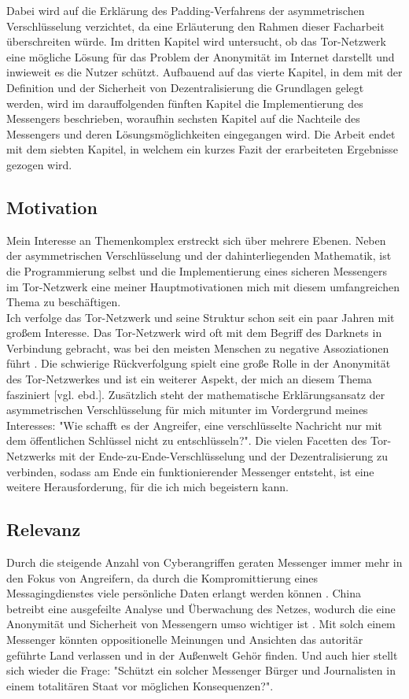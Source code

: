 \documentclass[a4paper,ngerman, headheight=28pt,12pt]{scrartcl}
\newcommand{\vcite}[1]{\cite[vgl.][]{#1}}
\newcommand{\vebd}{[vgl. ebd.]}
\begin{document}
Dabei wird auf die Erklärung des Padding-Verfahrens der asymmetrischen Verschlüsselung verzichtet, da eine Erläuterung den Rahmen dieser Facharbeit überschreiten würde. Im dritten Kapitel wird untersucht, ob das Tor-Netzwerk eine mögliche Lösung für das Problem der Anonymität im Internet darstellt und inwieweit es die Nutzer schützt.
Aufbauend auf das vierte Kapitel, in dem mit der Definition und der Sicherheit von Dezentralisierung die Grundlagen gelegt werden, wird im darauffolgenden fünften Kapitel die Implementierung des Messengers beschrieben, woraufhin sechsten Kapitel auf die Nachteile des Messengers und deren Lösungsmöglichkeiten eingegangen wird. Die Arbeit endet mit dem siebten Kapitel, in welchem ein kurzes Fazit der erarbeiteten Ergebnisse gezogen wird.

\subsection{Motivation}
Mein Interesse an Themenkomplex erstreckt sich über mehrere Ebenen. Neben der asymmetrischen Verschlüsselung und der dahinterliegenden Mathematik, ist die Programmierung selbst und die Implementierung eines sicheren Messengers im Tor-Netzwerk eine meiner Hauptmotivationen mich mit diesem umfangreichen Thema zu beschäftigen. \\
Ich verfolge das Tor-Netzwerk und seine Struktur schon seit ein paar Jahren mit großem Interesse. Das Tor-Netzwerk wird oft mit dem Begriff des Darknets in Verbindung gebracht, was bei den meisten Menschen zu negative Assoziationen führt \vcite{BsiTorDarknet}. Die schwierige Rückverfolgung spielt eine große Rolle in der Anonymität des Tor-Netzwerkes und ist ein weiterer Aspekt, der mich an diesem Thema fasziniert \vebd.
Zusätzlich steht der mathematische Erklärungsansatz der asymmetrischen Verschlüsselung für mich mitunter im Vordergrund meines Interesses: "Wie schafft es der Angreifer, eine verschlüsselte Nachricht nur mit dem öffentlichen Schlüssel nicht zu entschlüsseln?".
Die vielen Facetten des Tor-Netzwerks mit der Ende-zu-Ende-Verschlüsselung und der Dezentralisierung zu verbinden, sodass am Ende ein funktionierender Messenger entsteht, ist eine weitere Herausforderung, für die ich mich begeistern kann.

\subsection{Relevanz}
Durch die steigende Anzahl von Cyberangriffen geraten  Messenger immer mehr in den Fokus von Angreifern, da durch die Kompromittierung eines Messagingdienstes viele persönliche Daten erlangt werden können \vcite{Cyberattacks}. China betreibt eine ausgefeilte Analyse und Überwachung des Netzes, wodurch die eine Anonymität und Sicherheit von Messengern umso wichtiger ist \vcite{GreatFirewallChina}. Mit solch einem Messenger könnten oppositionelle Meinungen und Ansichten das autoritär geführte Land verlassen und in der Außenwelt Gehör finden. Und auch hier stellt sich wieder die Frage: "Schützt ein solcher Messenger Bürger und Journalisten in einem totalitären Staat vor möglichen Konsequenzen?".
\end{document}
